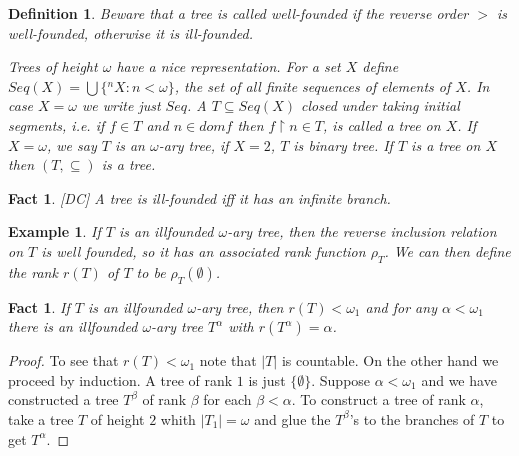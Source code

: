 \documentclass[a4paper,11pt,oneside]{mybook}
\def\conc{{^\smallfrown}}
\theoremstyle{theorem}
\newtheorem{fact}[subsection]{Fact}
\newtheorem{definition}[subsection]{Definition}
\theoremstyle{example}
\newtheorem{example}[subsection]{Example}
\begin{document}
{\begin{definition}
\smallskip

Beware that a tree is called \emph{well-founded} if the reverse order $>$ is well-founded, otherwise it is \emph{ill-founded}.

\smallskip

Trees of height $\omega$ have a nice representation. For a set $X$ define $Seq(X)=\bigcup\{{}^nX:n<\omega\}$, the set of all finite sequences of elements of $X$. In case $X=\omega$ we write just $Seq$. A $T\subseteq Seq(X)$ closed under taking initial segments, i.e. if $f\in T$ and $n\in dom f$ then $f\upharpoonright n\in T$, is called a tree on $X$. If $X=\omega$, we say $T$ is an \emph{$\omega$-ary tree}, if $X=2$, $T$ is \emph{binary tree}. If $T$ is a tree on $X$ then  $(T,\subseteq)$ is a tree.
\end{definition}


\begin{fact}{\rm [DC]}
A tree is ill-founded iff it has an infinite branch.
\end{fact}


\begin{example} If $T$ is an illfounded $\omega$-ary tree, then the reverse
inclusion relation on $T$ is
 well founded, so it has an associated rank function $\rho_T$.
We can then define the rank $r(T)$
 of $T$ to be $\rho_T(\emptyset)$.
\end{example}

\begin{fact}
If $T$ is an illfounded $\omega$-ary tree, then $r(T)<\omega_1$ and for any $\alpha<\omega_1$
 there is an illfounded $\omega$-ary tree $T^\alpha$ with $r(T^\alpha)=\alpha$.
\end{fact}

\begin{proof}
To see that $r(T)<\omega_1$ note that $|T|$ is countable. On the other hand we proceed by induction.
A tree of rank $1$ is just $\{\emptyset\}$. Suppose $\alpha<\omega_1$ and we have constructed a tree $T^\beta$ of rank $\beta$ for each $\beta<\alpha$.
To construct a tree of rank $\alpha$, take a tree $T$ of height $2$ whith $|T_1|=\omega$ and glue the $T^\beta$'s to the branches of $T$ to
get $T^\alpha$.
%
%
\end{proof}

}
\end{document}
